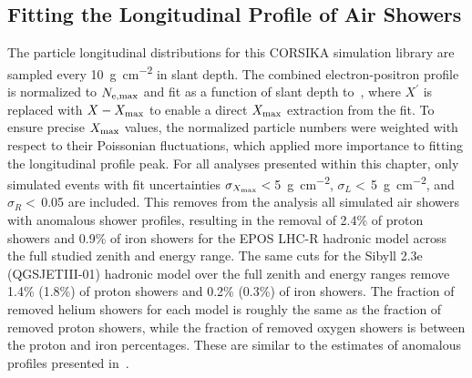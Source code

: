 


\subsection{Fitting the Longitudinal Profile of Air Showers}\label{ssec:profilefitting}
The particle longitudinal distributions for this CORSIKA simulation library are sampled every \qty{10}{\gram\per\centi\meter\squared} in slant depth.
The combined electron-positron profile is normalized to $N_{\rm e, max}$ and fit as a function of slant depth to~, where $X^{\prime}$ is replaced with $X - X_{\rm max}$ to enable a direct $X_{\rm max}$ extraction from the fit.
To ensure precise $X_{\rm max}$ values, the normalized particle numbers were weighted with respect to their Poissonian fluctuations, which applied more importance to fitting the longitudinal profile peak.
For all analyses presented within this chapter, only simulated events with fit uncertainties $\sigma_{X_{\rm max}}<\,$\qty{5}{\gram\per\centi\meter\squared}, $\sigma_{L}<\,$\qty{5}{\gram\per\centi\meter\squared}, and $\sigma_{R}<\,$0.05 are included.
This removes from the analysis all simulated air showers with anomalous shower profiles, resulting in the removal of 2.4\% of proton showers and 0.9\% of iron showers for the EPOS LHC-R hadronic model across the full studied zenith and energy range.
The same cuts for the Sibyll 2.3e (QGSJETIII-01) hadronic model over the full zenith and energy ranges remove 1.4\% (1.8\%) of proton showers and 0.2\% (0.3\%) of iron showers.
The fraction of removed helium showers for each model is roughly the same as the fraction of removed proton showers, while the fraction of removed oxygen showers is between the proton and iron percentages.
These are similar to the estimates of anomalous profiles presented in~\cite{icrc2011_baus_anomalousprofiles}.

